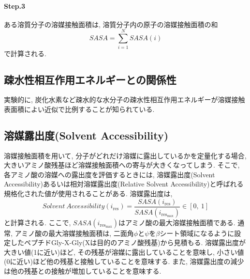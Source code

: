 \paragraph{Step.3} ある溶質分子の溶媒接触面積は, 溶質分子内の原子の溶媒接触面積の和
\begin{equation}
    SASA
    =
    \sum_{i=1}^{N} SASA(i)
\end{equation}
で計算される. 

\subsection{疎水性相互作用エネルギーとの関係性}
実験的に, 炭化水素など疎水的な水分子の疎水性相互作用エネルギーが溶媒接触表面積によい近似で比例することが知られている\cite{1970Nozaki, 2010TohHiroyuki}. 

\subsection{溶媒露出度(Solvent Accessibility)}
溶媒接触面積を用いて, 分子がどれだけ溶媒に露出しているかを定量化する場合, 大きいアミノ酸残基ほど溶媒接触面積への寄与が大きくなってしまう. 
そこで, 各アミノ酸の溶媒への露出度を評価するときには, 溶媒露出度(Solvent Accessibility)あるいは相対溶媒露出度(Relative Solvent Accessibility)と呼ばれる規格化された値が使用されることがある. 
溶媒露出度は, 
\begin{equation}
    Solvent~Accessibility (i_{\mathrm{res}}) =
    \frac{SASA(i_{\mathrm{res}})}{SASA(i_{\mathrm{res}_{\max}})} \in [0,~1]
\end{equation}
と計算される. 
ここで, $SASA(i_{\mathrm{res}_{\max}})$はアミノ酸の最大溶媒接触面積である. 
通常, アミノ酸の最大溶媒接触面積は, 二面角$\phi$と$\psi$を$\beta$シート領域になるように設定したペプチドGly-X-Gly(Xは目的のアミノ酸残基)から見積もる. 
溶媒露出度が大きい値(1に近い)ほど, その残基が溶媒に露出していることを意味し, 小さい値(0に近い)ほど他の残基と接触していることを意味する. 
また, 溶媒露出度の減少は他の残基との接触が増加していることを意味する. 





